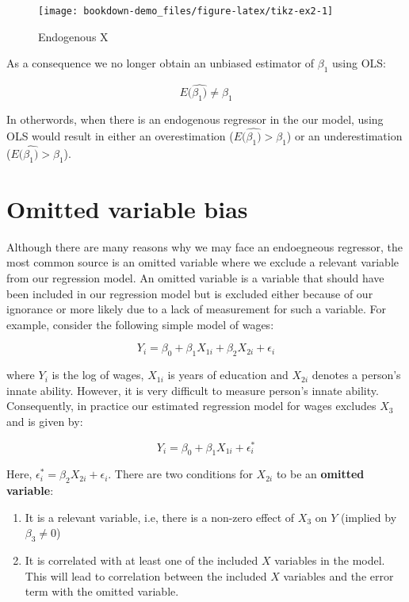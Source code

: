 \documentclass[
]{book}
\theoremstyle{definition}
\theoremstyle{definition}
\theoremstyle{definition}
\theoremstyle{definition}
\theoremstyle{remark}
\begin{document}
\begin{figure}

{\centering \texttt{[image: bookdown-demo\_files/figure-latex/tikz-ex2-1]} 

}

\caption{Endogenous X}\label{fig:tikz-ex2}
\end{figure}

As a consequence we no longer obtain an unbiased estimator of \(\beta_1\) using OLS:

\[E(\hat{\beta_1)} \neq \beta_1\]

In otherwords, when there is an endogenous regressor in the our model, using OLS would result in either an overestimation (\(E(\hat{\beta_1)}> \beta_1\)) or an underestimation (\(E(\hat{\beta_1)}> \beta_1\)).

\hypertarget{omitted-variable-bias}{%
\section{Omitted variable bias}\label{omitted-variable-bias}}

Although there are many reasons why we may face an endoegneous regressor, the most common source is an omitted variable where we exclude a relevant variable from our regression model. An omitted variable is a variable that should have been included in our regression model but is excluded either because of our ignorance or more likely due to a lack of measurement for such a variable. For example, consider the following simple model of wages:

\[Y_i = \beta_0 + \beta_1 X_{1i} + \beta_2X_{2i}+\epsilon_i\]

where \(Y_i\) is the log of wages, \(X_{1i}\) is years of education and \(X_{2i}\) denotes a person's innate ability. However, it is very difficult to measure person's innate ability. Consequently, in practice our estimated regression model for wages excludes \(X_3\) and is given by:

\[Y_i = \beta_0 + \beta_1 X_{1i} + \epsilon_i^*\]

Here, \(\epsilon_i^*=\beta_2 X_{2i}+\epsilon_i\). There are two conditions for \(X_{2i}\) to be an \textbf{omitted variable}:

\begin{enumerate}
\def\labelenumi{\arabic{enumi}.}
\item
  It is a relevant variable, i.e, there is a non-zero effect of \(X_3\) on \(Y\) (implied by \(\beta_3\neq 0\))
\item
  It is correlated with at least one of the included \(X\) variables in the model. This will lead to correlation between the included \(X\) variables and the error term with the omitted variable.
\end{enumerate}
\end{document}
